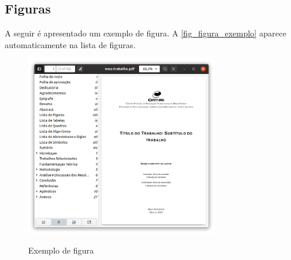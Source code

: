 \begin{apendicesenv}
    \section{Figuras}
    \label{sec_figuras}

    A seguir é apresentado um exemplo de figura.
    A \autoref{fig_figura_exemplo} aparece automaticamente na lista de figuras.

    \begin{figure}[!htb]
        \centering
        \caption{Exemplo de figura}
        \includegraphics[width=0.75\textwidth]{figuras/figura-exemplo.png}
        \label{fig_figura_exemplo}
    \end{figure}


\end{apendicesenv}
